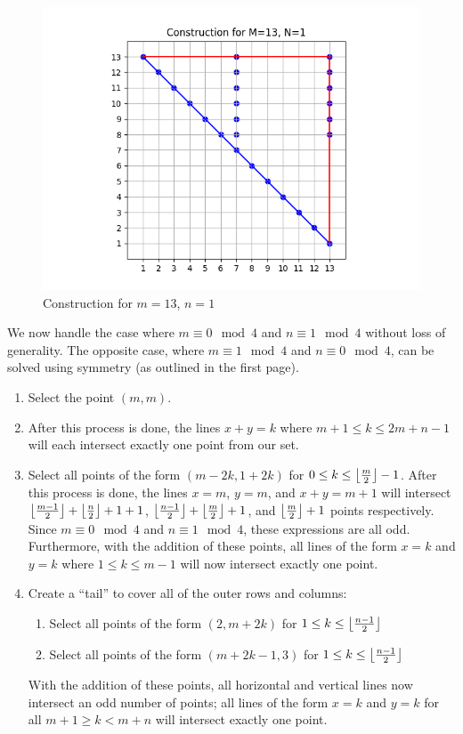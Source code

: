 \documentclass[10pt]{../usamts}
\begin{document}
\begin{solution}
\begin{figure}[ht]
\centering
    \includegraphics[width=12cm]{round2/p5construct/construct_13_1.png}
    \caption{Construction for $m=13$, $n=1$}
    \label{fig:131construct}
\end{figure}
\clearpage 
We now handle the case where $m \equiv 0 \mod 4$ and $n \equiv 1 \mod 4$ without loss of generality. The opposite case, where $m \equiv 1 \mod 4$ and $n \equiv 0 \mod 4$, can be solved using symmetry (as outlined in the first page).

\begin{enumerate}
    \item Select the point $(m,m)$.
    \item \mainaxis
    After this process is done, the lines $x+y = k$ where $m+1 \leq k \leq 2m+n-1$ will each intersect exactly one point from our set.
    \item Select all points of the form $(m-2k, 1+2k)$ for $0 \leq k \leq \left\lfloor \frac{m}{2} \right\rfloor-1$.
    After this process is done, the lines $x=m$, $y=m$, and $x+y = m+1$ will intersect $\left\lfloor \frac{m-1}{2} \right\rfloor + \left\lfloor \frac{n}{2} \right\rfloor + 1 + 1$, $\left\lfloor \frac{n-1}{2} \right\rfloor + \left\lfloor \frac{m}{2} \right\rfloor + 1$, and $\left\lfloor \frac{m}{2} \right\rfloor + 1$ points respectively. Since $m \equiv 0 \mod 4$ and $n \equiv 1 \mod 4$, these expressions are all odd. Furthermore, with the addition of these points, all lines of the form $x=k$ and $y=k$ where $1 \leq k \leq m-1$ will now intersect exactly one point.
    \item Create a ``tail'' to cover all of the outer rows and columns:
    \begin{enumerate}
        \item Select all points of the form $(2, m+2k)$ for $1 \leq k \leq \left\lfloor \frac{n-1}{2} \right\rfloor$
        \item Select all points of the form $(m+2k-1, 3)$ for $1 \leq k \leq \left\lfloor \frac{n-1}{2} \right\rfloor$
    \end{enumerate}
    With the addition of these points, all horizontal and vertical lines now intersect an odd number of points; all lines of the form $x = k$ and $y=k$ for all $m+1 \geq k < m+n$ will intersect exactly one point.
    

\end{enumerate}
\end{solution}
\end{document}
